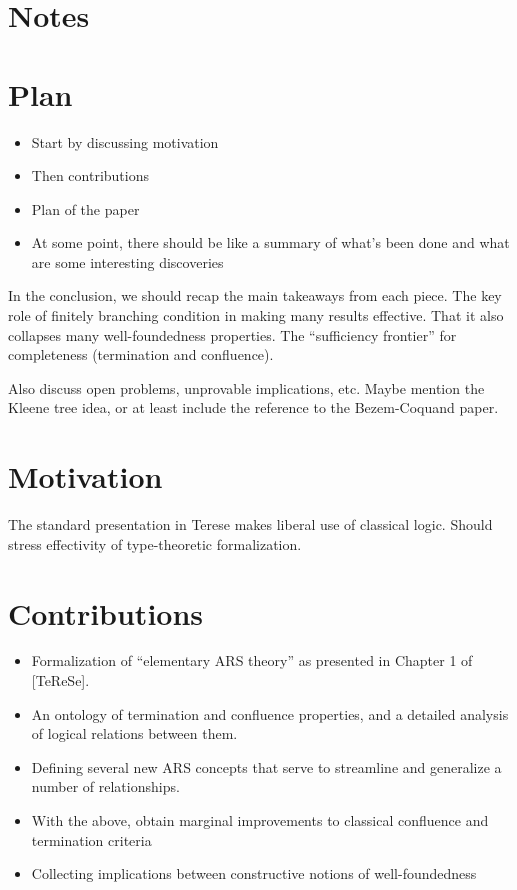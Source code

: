 \documentclass{scrartcl}
\begin{document}
\section*{Notes}

\section{Plan}
\begin{itemize}
  \item Start by discussing motivation
  \item Then contributions
  \item Plan of the paper
  \item At some point, there should be like a summary of what's been done and what are some interesting discoveries
\end{itemize}

In the conclusion, we should recap the main takeaways from each piece.
The key role of finitely branching condition in making many results effective.
That it also collapses many well-foundedness properties.
The ``sufficiency frontier'' for completeness (termination and confluence).

Also discuss open problems, unprovable implications, etc.
Maybe mention the Kleene tree idea, or at least include the reference to the Bezem-Coquand paper.

\section{Motivation}

The standard presentation in Terese makes liberal use of classical logic.
Should stress effectivity of type-theoretic formalization.
\section{Contributions}

\begin{itemize}
  \item Formalization of ``elementary ARS theory'' as presented in
  Chapter 1 of [TeReSe].
  \item An ontology of termination and confluence properties, and a detailed analysis of logical relations between them.
  \item Defining several new ARS concepts that serve to streamline and generalize a number of relationships.
  \item With the above, obtain marginal improvements to classical confluence and termination criteria
  \item Collecting implications between constructive notions of well-foundedness
\end{itemize}
\end{document}
